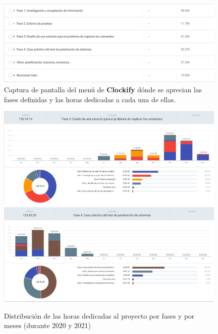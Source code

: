 \begin{figure}[!hbt]
  \centering
  \includegraphics[width=\textwidth]{imagenes/Fases.png}
  \caption{Captura de pantalla del menú de \textbf{Clockify} dónde se aprecian las fases definidas y las horas dedicadas a cada una de ellas.}
  \label{clockifyfases}
\end{figure}


\begin{figure}[!hbt]
  \centering
  \includegraphics[width=\textwidth]{imagenes/clockifyme_1.png}
  \includegraphics[width=\textwidth]{imagenes/clockifyme_2.png}
  \caption{Distribución de las horas dedicadas al proyecto por fases y por meses (durante 2020 y 2021)}
  \label{clockify_horas}
\end{figure}

